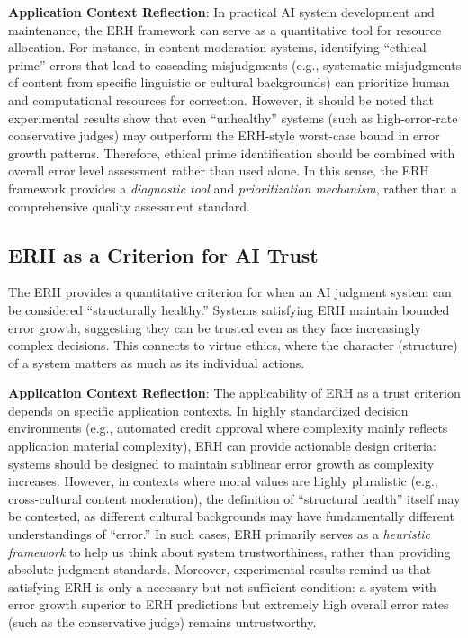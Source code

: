 \documentclass[12pt,a4paper]{article}
\theoremstyle{definition}
\theoremstyle{remark}
\begin{document}
\textbf{Application Context Reflection}: In practical AI system development and maintenance, the ERH framework can serve as a quantitative tool for resource allocation. For instance, in content moderation systems, identifying ``ethical prime'' errors that lead to cascading misjudgments (e.g., systematic misjudgments of content from specific linguistic or cultural backgrounds) can prioritize human and computational resources for correction. However, it should be noted that experimental results show that even ``unhealthy'' systems (such as high-error-rate conservative judges) may outperform the ERH-style worst-case bound in error growth patterns. Therefore, ethical prime identification should be combined with overall error level assessment rather than used alone. In this sense, the ERH framework provides a \emph{diagnostic tool} and \emph{prioritization mechanism}, rather than a comprehensive quality assessment standard.

\subsection{ERH as a Criterion for AI Trust}

The ERH provides a quantitative criterion for when an AI judgment system can be considered ``structurally healthy.'' Systems satisfying ERH maintain bounded error growth, suggesting they can be trusted even as they face increasingly complex decisions. This connects to virtue ethics, where the character (structure) of a system matters as much as its individual actions.

\textbf{Application Context Reflection}: The applicability of ERH as a trust criterion depends on specific application contexts. In highly standardized decision environments (e.g., automated credit approval where complexity mainly reflects application material complexity), ERH can provide actionable design criteria: systems should be designed to maintain sublinear error growth as complexity increases. However, in contexts where moral values are highly pluralistic (e.g., cross-cultural content moderation), the definition of ``structural health'' itself may be contested, as different cultural backgrounds may have fundamentally different understandings of ``error.'' In such cases, ERH primarily serves as a \emph{heuristic framework} to help us think about system trustworthiness, rather than providing absolute judgment standards. Moreover, experimental results remind us that satisfying ERH is only a necessary but not sufficient condition: a system with error growth superior to ERH predictions but extremely high overall error rates (such as the conservative judge) remains untrustworthy.
\end{document}
